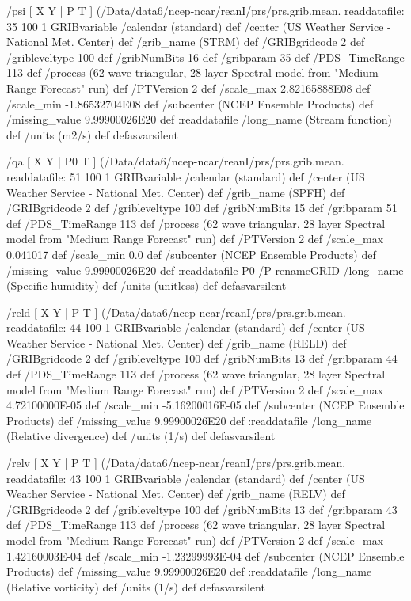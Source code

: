 \begin{ingrid}
  /psi { [ X Y | P T ] (/Data/data6/ncep-ncar/reanI/prs/prs.grib.mean.%
  readdatafile:
  35 100 1 GRIBvariable
  /calendar (standard) def
  /center (US Weather Service - National Met. Center) def
  /grib_name (STRM) def
  /GRIBgridcode 2 def
  /gribleveltype 100 def
  /gribNumBits 16 def
  /gribparam 35 def
  /PDS_TimeRange 113 def
  /process (62 wave triangular, 28 layer Spectral model from "Medium Range Forecast" run) def
  /PTVersion 2 def
  /scale_max 2.82165888E08 def
  /scale_min -1.86532704E08 def
  /subcenter (NCEP Ensemble Products) def
  /missing_value 9.99900026E20 def
  :readdatafile
  /long_name (Stream function) def
  /units (m2/s) def
  } defasvarsilent

  /qa { [ X Y | P0 T ] (/Data/data6/ncep-ncar/reanI/prs/prs.grib.mean.%
  readdatafile:
  51 100 1 GRIBvariable
  /calendar (standard) def
  /center (US Weather Service - National Met. Center) def
  /grib_name (SPFH) def
  /GRIBgridcode 2 def
  /gribleveltype 100 def
  /gribNumBits 15 def
  /gribparam 51 def
  /PDS_TimeRange 113 def
  /process (62 wave triangular, 28 layer Spectral model from "Medium Range Forecast" run) def
  /PTVersion 2 def
  /scale_max 0.041017 def
  /scale_min 0.0 def
  /subcenter (NCEP Ensemble Products) def
  /missing_value 9.99900026E20 def
  :readdatafile
  P0 /P renameGRID
  /long_name (Specific humidity) def
  /units (unitless) def
  } defasvarsilent

  /reld { [ X Y | P T ] (/Data/data6/ncep-ncar/reanI/prs/prs.grib.mean.%
  readdatafile:
  44 100 1 GRIBvariable
  /calendar (standard) def
  /center (US Weather Service - National Met. Center) def
  /grib_name (RELD) def
  /GRIBgridcode 2 def
  /gribleveltype 100 def
  /gribNumBits 13 def
  /gribparam 44 def
  /PDS_TimeRange 113 def
  /process (62 wave triangular, 28 layer Spectral model from "Medium Range Forecast" run) def
  /PTVersion 2 def
  /scale_max 4.72100000E-05 def
  /scale_min -5.16200016E-05 def
  /subcenter (NCEP Ensemble Products) def
  /missing_value 9.99900026E20 def
  :readdatafile
  /long_name (Relative divergence) def
  /units (1/s) def
  } defasvarsilent

  /relv { [ X Y | P T ] (/Data/data6/ncep-ncar/reanI/prs/prs.grib.mean.%
  readdatafile:
  43 100 1 GRIBvariable
  /calendar (standard) def
  /center (US Weather Service - National Met. Center) def
  /grib_name (RELV) def
  /GRIBgridcode 2 def
  /gribleveltype 100 def
  /gribNumBits 13 def
  /gribparam 43 def
  /PDS_TimeRange 113 def
  /process (62 wave triangular, 28 layer Spectral model from "Medium Range Forecast" run) def
  /PTVersion 2 def
  /scale_max 1.42160003E-04 def
  /scale_min -1.23299993E-04 def
  /subcenter (NCEP Ensemble Products) def
  /missing_value 9.99900026E20 def
  :readdatafile
  /long_name (Relative vorticity) def
  /units (1/s) def
  } defasvarsilent


\end{ingrid}
